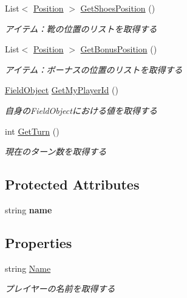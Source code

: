 \begin{DoxyCompactItemize}
List$<$ \hyperlink{classhoppin_1_1_game_information_1_1_position}{Position} $>$ \hyperlink{classhoppin_1_1_game_information_1_1_abstract_player_a8df55e5a2da45b535d3d980119ed0a94}{Get\+Shoes\+Position} ()
\begin{DoxyCompactList}\small\item\em アイテム：靴の位置のリストを取得する \end{DoxyCompactList}\item 
List$<$ \hyperlink{classhoppin_1_1_game_information_1_1_position}{Position} $>$ \hyperlink{classhoppin_1_1_game_information_1_1_abstract_player_a0cae03263a7de986a4456de802ee3a89}{Get\+Bonus\+Position} ()
\begin{DoxyCompactList}\small\item\em アイテム：ボーナスの位置のリストを取得する \end{DoxyCompactList}\item 
\hyperlink{namespacehoppin_1_1_game_information_a550036a5a24113f1dbc2384284a03d18}{Field\+Object} \hyperlink{classhoppin_1_1_game_information_1_1_abstract_player_ac99dac78a4925fa8ec55d61f70b71adc}{Get\+My\+Player\+Id} ()
\begin{DoxyCompactList}\small\item\em 自身の\+Field\+Objectにおける値を取得する \end{DoxyCompactList}\item 
int \hyperlink{classhoppin_1_1_game_information_1_1_abstract_player_a02eb13cfc8244f0be9f4f19aa450ec56}{Get\+Turn} ()
\begin{DoxyCompactList}\small\item\em 現在のターン数を取得する \end{DoxyCompactList}\end{DoxyCompactItemize}
\subsection*{Protected Attributes}
\begin{DoxyCompactItemize}
\item 
string {\bfseries name}\hypertarget{classhoppin_1_1_game_information_1_1_abstract_player_adb45026d00edad25a4eee437222165f0}{}\label{classhoppin_1_1_game_information_1_1_abstract_player_adb45026d00edad25a4eee437222165f0}

\end{DoxyCompactItemize}
\subsection*{Properties}
\begin{DoxyCompactItemize}
\item 
string \hyperlink{classhoppin_1_1_game_information_1_1_abstract_player_a2f41b3d51e4873b6eb2ac04c1c38adcd}{Name}
\begin{DoxyCompactList}\small\item\em プレイヤーの名前を取得する \end{DoxyCompactList}\end{DoxyCompactItemize}


